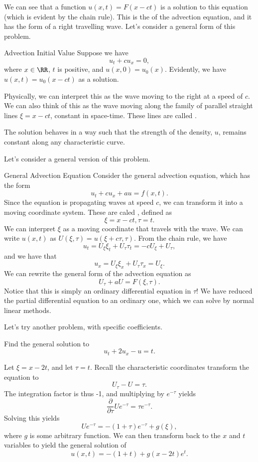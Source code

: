 We can see that a function $u(x,t) = F(x - ct)$ is a solution to this equation (which is evident by the chain rule). This is the  of the advection equation, and it has the form of a right travelling wave. Let's consider a general form of this problem.
\begin{example}{Advection Initial Value}{}
Suppose we have 
\[ u_t + cu_x = 0, \] where $x \in \RR$, $t$ is positive, and $u(x,0) = u_0(x)$. Evidently, we have $u(x,t) = u_0(x - ct)$ as a solution. 
\end{example}
Physically, we can interpret this as the wave moving to the right at a speed of $c$. We can also think of this as the wave moving along the family of parallel straight lines $\xi = x - ct$, constant in space-time. These lines are called . 

The solution behaves in a way such that the strength of the density, $u$, remains constant along any characteristic curve. 

Let's consider a general version of this problem. 
\begin{example}{General Advection Equation}{}
Consider the general advection equation, which has the form 
\[ u_t + cu_x + au = f(x,t). \] 
Since the equation is propagating waves at speed $c$, we can transform it into a moving coordinate system. These are caled , defined as 
\[ \xi = x - ct, \tau = t. \] We can interpret $\xi$ as a moving coordinate that travels with the wave. We can write $u(x,t)$ as $U(\xi, \tau) = u(\xi+c\tau, \tau)$. From the chain rule, we have 
\[ u_t = U_\xi\xi_t + U_\tau\tau_t = -cU_\xi + U_\tau, \] and we have that 
\[ u_x = U_\xi\xi_x + U_\tau\tau_x = U_\xi. \] We can rewrite the general form of the advection equation as 
\[ U_\tau + aU = F(\xi, \tau). \] Notice that this is simply an ordinary differential equation in $\tau$! We have reduced the partial differential equation to an ordinary one, which we can solve by normal linear methods. 
\end{example}

Let's try another problem, with specific coefficients. 
\begin{exercise}
Find the general solution to 
\[ u_t + 2u_x - u = t. \] 
\end{exercise}
\begin{sol}
Let $\xi = x - 2t$, and let $\tau = t$. Recall the characteristic coordinates transform the equation to 
\[ U_\tau - U = \tau. \] 	The integration factor is thus -1, and multiplying by $e^{-\tau}$ yields 
\[ \frac{\partial}{\partial \tau}Ue^{-\tau} = \tau e^{-\tau}. \] Solving this yields 
\[ Ue^{-\tau} = -(1 + \tau)e^{-\tau} + g(\xi), \] where $g$ is some arbitrary function. We can then transform back to the $x$ and $t$ variables to yield the general solution of 
\[ \boxed{u(x,t) = -(1+t) + g(x - 2t)e^t}. \] 
\end{sol}


